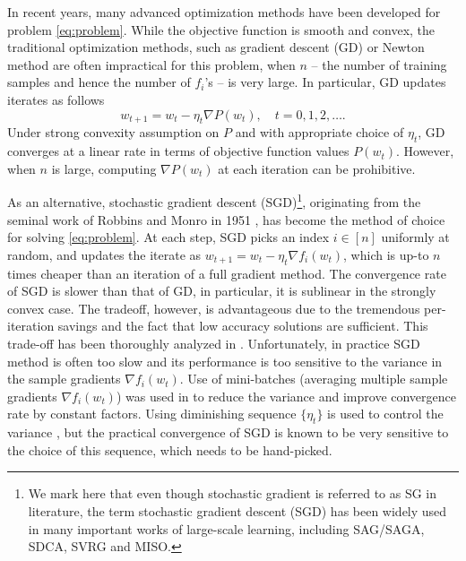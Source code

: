 \documentclass{article}
\newcommand{\setn}{[n]}
\begin{document}
In recent years, many advanced optimization methods have been developed for problem  \eqref{eq:problem}. While the objective function is smooth and convex, the traditional optimization methods, such as gradient descent (GD) or Newton method are often impractical for this problem, when $n$ -- 
the number of training samples and hence the number of $f_i$'s -- is very large. In particular, GD updates iterates as follows
 $$w_{t+1} = w_{t} - \eta_t \nabla P(w_{t}), \quad t=0, 1, 2, \ldots .$$
Under strong convexity assumption on $P$ and with appropriate choice of $\eta_t$, GD converges at a linear rate in terms of objective function values $P(w_t)$. 
However, when $n$ is large, computing $ \nabla P(w_{t})$ at each iteration can be prohibitive. 

As an alternative, stochastic gradient descent (SGD)\footnote{We mark here that even though stochastic gradient is referred to as SG in literature, the term stochastic gradient descent (SGD) has been widely used in many important works of large-scale learning, including SAG/SAGA, SDCA, SVRG and MISO.}, originating from the seminal work of Robbins and Monro in 1951 \cite{RM1951}, has become the method of choice for solving \eqref{eq:problem}. At each step, SGD picks an index $i\in \setn$ uniformly at random, and updates the iterate as
$w_{t+1} = w_{t} - \eta_t \nabla f_i(w_{t})$, which is up-to  $n$ times cheaper than an iteration of a full gradient method. The convergence rate of SGD is 
slower than that of GD, in particular, it is sublinear in the strongly convex case. The tradeoff, however, is advantageous due to the tremendous per-iteration savings and the fact that low accuracy solutions are sufficient. This trade-off has been thoroughly analyzed in \cite{Bottou1998}.  Unfortunately, in practice SGD method is often too slow and its performance is too sensitive  to the variance in the sample gradients $\nabla f_i(w_{t})$. Use of mini-batches (averaging multiple  sample gradients $\nabla f_i(w_{t})$) was used in  \cite{pegasosICML, acceleratedmb, takac2013ICML} to reduce the variance and improve convergence rate by  constant factors. Using diminishing sequence $\{\eta_t\}$ is used to control the variance \cite{pegasos, bottou2016optimization}, but the practical convergence of SGD is known to be very sensitive to the choice of this sequence, which needs to be hand-picked. 
\end{document}
